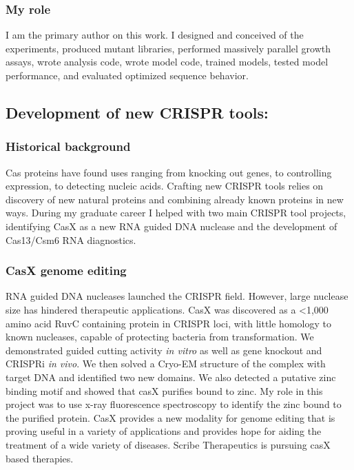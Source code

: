 \documentclass{article}
\begin{document}
\subsubsection{My role}
I am the primary author on this work.
I designed and conceived of the experiments, produced mutant libraries, performed massively parallel growth assays, wrote analysis code, wrote model code, trained models, tested model performance, and evaluated optimized sequence behavior.
%

\leavevmode\pagebreak


\newrefsection
\subsection{Development of new CRISPR tools:}
\subsubsection{Historical background}
Cas proteins have found uses ranging from knocking out genes, to controlling expression, to detecting nucleic acids.
Crafting new CRISPR tools relies on discovery of new natural proteins and combining already known proteins in new ways.
During my graduate career I helped with two main CRISPR tool projects, identifying CasX as a new RNA guided DNA nuclease and the development of Cas13/Csm6 RNA diagnostics.
%
\subsubsection{CasX genome editing}
RNA guided DNA nucleases launched the CRISPR field.
However, large nuclease size has hindered therapeutic applications.
CasX was discovered as a <1,000 amino acid RuvC containing protein in CRISPR loci, with little homology to known nucleases, capable of protecting bacteria from transformation.
We demonstrated guided cutting activity \textit{in vitro} as well as gene knockout and CRISPRi \textit{in vivo}.
We then solved a Cryo-EM structure of the complex with target DNA and identified two new domains.
We also detected a putative zinc binding motif and showed that casX purifies bound to zinc.
My role in this project was to use x-ray fluorescence spectroscopy to identify the zinc bound to the purified protein.
CasX provides a new modality for genome editing that is proving useful in a variety of applications and provides hope for aiding the treatment of a wide variety of diseases.
Scribe Therapeutics is pursuing casX based therapies.
%
\end{document}
